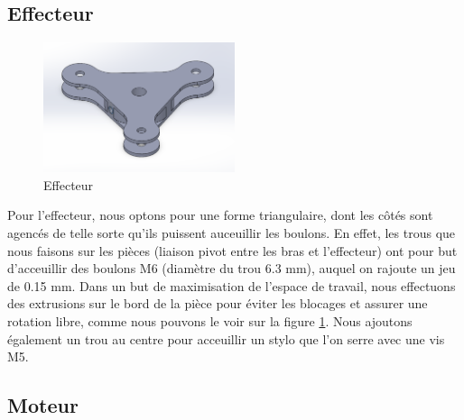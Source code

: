 \documentclass[a4paper, 11pt]{report}
\begin{document}
\subsection{Effecteur}


\begin{figure}[!tbh]
    \centering
    \includegraphics[width=0.5\textwidth]{Figures/effecteur.png}
    \caption{Effecteur}
    \label{fig:effecteur}
\end{figure}
Pour l'effecteur, nous optons pour une forme triangulaire, dont les côtés sont agencés de telle sorte qu'ils puissent auceuillir les boulons.
En effet, les trous que nous faisons sur les pièces (liaison pivot entre les bras et l'effecteur)
ont pour but d'acceuillir des boulons M6 (diamètre du trou 6.3 mm), auquel on rajoute un jeu de 0.15 mm.
Dans un but de maximisation de l'espace de travail, nous effectuons des extrusions sur le bord de la pièce pour éviter les blocages et assurer une rotation libre,
comme nous pouvons le voir sur la figure \ref{fig:effecteur}. 
Nous ajoutons également un trou au centre pour acceuillir un stylo que l'on serre avec une vis M5.

\subsection{Moteur}

\end{document}
